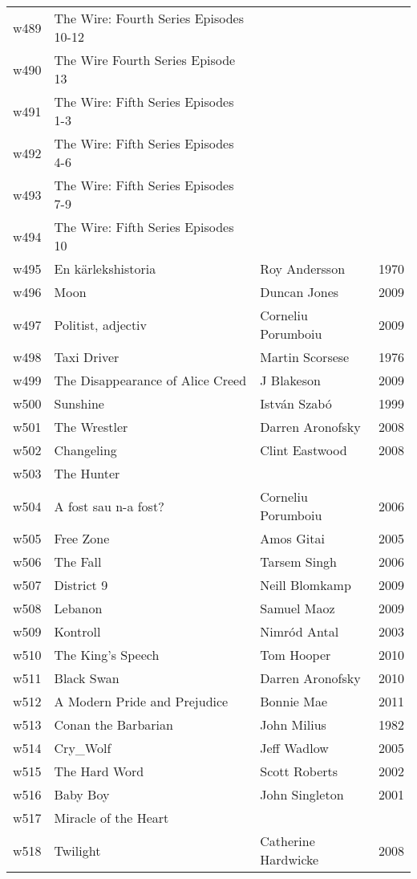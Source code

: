 \documentclass{article}
\begin{document}
\begin {center}
\begin{longtable}{l p{10cm} l l}
w489 & The Wire: Fourth Series Episodes 10-12 &  &  \\
w490 & The Wire Fourth Series Episode 13 &  &  \\
w491 & The Wire: Fifth Series Episodes 1-3 &  &  \\
w492 & The Wire: Fifth Series Episodes 4-6 &  &  \\
w493 & The Wire: Fifth Series Episodes 7-9 &  &  \\
w494 & The Wire: Fifth Series Episodes 10 &  &  \\
w495 & En kärlekshistoria & Roy Andersson & 1970 \\
w496 & Moon & Duncan Jones & 2009 \\
w497 & Politist, adjectiv & Corneliu Porumboiu & 2009 \\
w498 & Taxi Driver & Martin Scorsese & 1976 \\
w499 & The Disappearance of Alice Creed & J Blakeson & 2009 \\
w500 & Sunshine & István Szabó & 1999 \\
w501 & The Wrestler & Darren Aronofsky & 2008 \\
w502 & Changeling & Clint Eastwood & 2008 \\
w503 & The Hunter &  &  \\
w504 & A fost sau n-a fost? & Corneliu Porumboiu & 2006 \\
w505 & Free Zone & Amos Gitai & 2005 \\
w506 & The Fall & Tarsem Singh & 2006 \\
w507 & District 9 & Neill Blomkamp & 2009 \\
w508 & Lebanon & Samuel Maoz & 2009 \\
w509 & Kontroll & Nimród Antal & 2003 \\
w510 & The King's Speech & Tom Hooper & 2010 \\
w511 & Black Swan & Darren Aronofsky & 2010 \\
w512 & A Modern Pride and Prejudice & Bonnie Mae & 2011 \\
w513 & Conan the Barbarian & John Milius & 1982 \\
w514 & Cry\_Wolf & Jeff Wadlow & 2005 \\
w515 & The Hard Word & Scott Roberts & 2002 \\
w516 & Baby Boy & John Singleton & 2001 \\
w517 & Miracle of the Heart &  &  \\
w518 & Twilight & Catherine Hardwicke & 2008 \\

\end{longtable}
\end{center}
\end{document}
